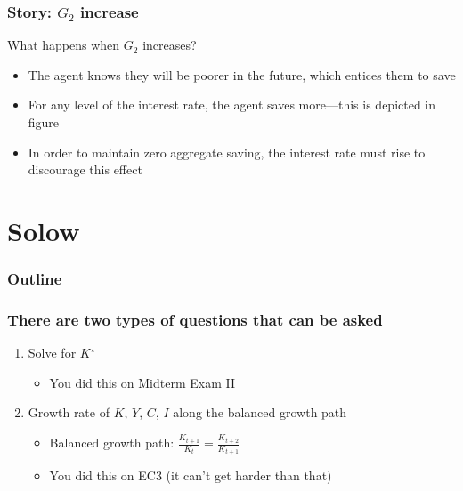 \documentclass[presentation,dvipsnames]{beamer}
\begin{document}
\begin{frame}
\frametitle{Story: $G_{2}$ increase}
What happens when $G_{2}$ increases?
\begin{itemize}[label={--}]
\item The agent knows they will be poorer in the future, which entices them to save
\item For any level of the interest rate, the agent saves more---this is depicted in figure
\item In order to maintain zero aggregate saving, the interest rate must rise to discourage this effect
\end{itemize}
\end{frame}

\label{sec-3}
\section{Solow}

\begin{frame}
\frametitle{Outline}
\tableofcontents[currentsection]
\end{frame}

\begin{frame}
\frametitle{There are two types of questions that can be asked}

\begin{enumerate}[label=(\roman*)]
\item\label{item:3} Solve for $K^{\star}$
\begin{itemize}[label={--}]
\item You did this on Midterm Exam II
\end{itemize}
\item Growth rate of $K$, $Y$, $C$, $I$ along the balanced growth path
\begin{itemize}[label={--}]
\item Balanced growth path: $\frac{K_{t+1}}{K_{t}} = \frac{K_{t+2}}{K_{t+1}}$
\item You did this on EC3 (it can't get harder than that)
\end{itemize}
\end{enumerate}


\end{frame}
\end{document}
